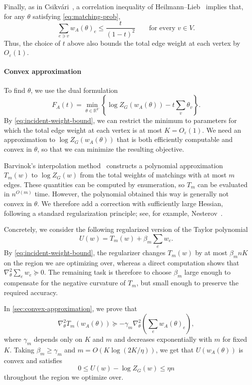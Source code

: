 \documentclass[11pt,reqno,letterpaper]{amsart}
\numberwithin{equation}{section}
\theoremstyle{definition}
\theoremstyle{remark}
\newcommand{\R}{\mathbb R}
\begin{document}
Finally, as in Csikv\'ari~\cite{CsikvariVertexTransitive}, a
correlation inequality of Heilmann--Lieb~\cite{HL} implies that,
for any $\theta$ satisfying \cref{eq:matching-prob},
\begin{equation}
\label{eq:incident-weight-bound}
 \sum_{e\ni v}w_A(\theta)_e
 \le \frac{t}{(1-t)^2}
 \qquad\text{for every }v\in V.
\end{equation}
Thus, the choice of $t$ above also bounds the total edge
weight at each vertex by $O_\varepsilon(1)$.

\medskip

\paragraph{\bf Convex approximation}
To find $\theta$, we use the dual formulation
\[
 F_A(t)=\min_{\theta\in\R^V}
 \left\{\log Z_G(w_A(\theta))-t\sum_v\theta_v\right\}.
\]
By \eqref{eq:incident-weight-bound}, we can restrict the minimum to
parameters for which the total edge weight at each vertex
is at most $K=O_\varepsilon(1)$. We need an approximation
to $\log Z_G(w_A(\theta))$ that is both efficiently computable
and convex in $\theta$, so that we can minimize the
resulting objective.

Barvinok's interpolation method~\cite{Barvinok,BarvinokReal}
constructs a polynomial approximation $T_m(w)$ to
$\log Z_G(w)$ from the total weights of matchings with at
most $m$ edges. These quantities can be computed by
enumeration, so $T_m$ can be evaluated in $n^{O(m)}$ time. However, the polynomial obtained this way is generally not convex in
$\theta$. We therefore add a correction with sufficiently large Hessian, following a standard
regularization principle; see, for example,
Nesterov~\cite[Theorem~1]{NesterovTensor}.

Concretely, we consider the following regularized version of the Taylor polynomial
\[
 U(w)=T_m(w)+\beta_m\sum_e w_e.
\]
By \eqref{eq:incident-weight-bound}, the regularizer changes $T_m(w)$ by at most $\beta_m n K$ on the region we are optimizing over, whereas a direct computation shows that $\nabla_\theta^2 \sum_e w_e \succeq 0$. The remaining task is therefore to choose $\beta_m$ large enough to compensate for the negative curvature of $T_m$, but small enough to preserve the required accuracy. 

In \cref{sec:convex-approximation}, we prove that
\[
 \nabla_\theta^2 T_m(w_A(\theta))
 \succeq
 -\gamma_m\nabla_\theta^2
 \left(\sum_e w_A(\theta)_e\right),
\]
where $\gamma_m$ depends only on $K$ and $m$ and decreases
exponentially with $m$ for fixed $K$. Taking $\beta_m \geq \gamma_m$ and $m=O(K\log(2K/\eta))$, we get that $U(w_A(\theta))$ is convex and satisfies
\[
 0\le U(w)-\log Z_G(w)\le\eta n
\]
throughout the region we optimize over. 
\end{document}
